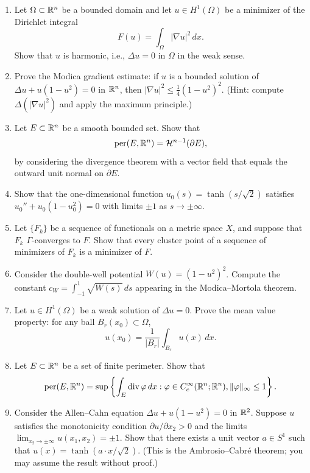 \begin{enumerate}
    \item [B] Let \(\Omega \subset \mathbb{R}^n\) be a bounded domain and let \(u \in H^1(\Omega)\) be a minimizer of the Dirichlet integral
    \[
    F(u) = \int_\Omega |\nabla u|^2\,dx.
    \]
    Show that \(u\) is harmonic, i.e., \(\Delta u = 0\) in \(\Omega\) in the weak sense.
    \item [I] Prove the Modica gradient estimate: if \(u\) is a bounded solution of \(\Delta u + u(1-u^2) = 0\) in \(\mathbb{R}^n\), then \(|\nabla u|^2 \leq \frac{1}{4}(1-u^2)^2\). (Hint: compute \(\Delta (|\nabla u|^2)\) and apply the maximum principle.)
    \item [B] Let \(E \subset \mathbb{R}^n\) be a smooth bounded set. Show that
    \[
    \operatorname{per}(E,\mathbb{R}^n) = \mathcal{H}^{n-1}(\partial E),
    \]
    by considering the divergence theorem with a vector field that equals the outward unit normal on \(\partial E\).
    \item [B] Show that the one-dimensional function \(u_0(s) = \tanh(s/\sqrt{2})\) satisfies \(u_0'' + u_0(1-u_0^2) = 0\) with limits \(\pm 1\) as \(s \to \pm \infty\).
    \item [I] Let \(\{F_k\}\) be a sequence of functionals on a metric space \(X\), and suppose that \(F_k\) \(\Gamma\)-converges to \(F\). Show that every cluster point of a sequence of minimizers of \(F_k\) is a minimizer of \(F\).
    \item [B] Consider the double-well potential \(W(u) = (1-u^2)^2\). Compute the constant \(c_W = \int_{-1}^1 \sqrt{W(s)}\,ds\) appearing in the Modica--Mortola theorem.
    \item [B] Let \(u \in H^1(\Omega)\) be a weak solution of \(\Delta u = 0\). Prove the mean value property: for any ball \(B_r(x_0) \subset \Omega\),
    \[
    u(x_0) = \frac{1}{|B_r|} \int_{B_r} u(x)\,dx.
    \]
    \item [B] Let \(E \subset \mathbb{R}^n\) be a set of finite perimeter. Show that
    \[
    \operatorname{per}(E,\mathbb{R}^n) = \sup \left\{ \int_E \operatorname{div} \varphi \, dx : \varphi \in C^\infty_c(\mathbb{R}^n; \mathbb{R}^n), \|\varphi\|_\infty \leq 1 \right\}.
    \]
    \item [A] Consider the Allen--Cahn equation \(\Delta u + u(1-u^2) = 0\) in \(\mathbb{R}^2\). Suppose \(u\) satisfies the monotonicity condition \(\partial u/\partial x_2 > 0\) and the limits \(\lim_{x_2 \to \pm \infty} u(x_1,x_2) = \pm 1\). Show that there exists a unit vector \(a \in S^1\) such that \(u(x) = \tanh(a \cdot x / \sqrt{2})\). (This is the Ambrosio--Cabr\'e theorem; you may assume the result without proof.)

\end{enumerate}
